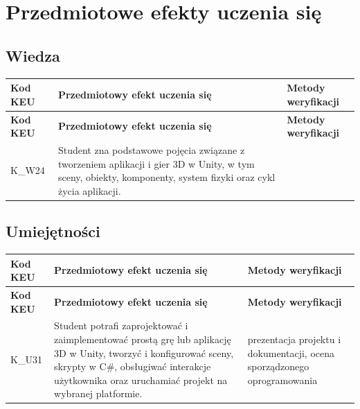 \documentclass[12pt, a4paper]{article}
\newcommand{\thdrule}{\noalign{\global\setlength{\extrarowheight}{0pt}}}
\newcommand{\thdend}{\noalign{\global\setlength{\extrarowheight}{3pt}}}
\begin{document}
\section{Przedmiotowe efekty uczenia się}

\subsection*{Wiedza}
{\scriptsize
\begin{longtable}{m{1.6cm}m{9.0cm}m{4.2cm}}
\thdrule\toprule
\rowcolor{pjatkRed} {\color{white}\footnotesize\textbf{\vphantom{Ag}Kod KEU}} & {\color{white}\footnotesize\textbf{\vphantom{Ag}Przedmiotowy efekt uczenia się}} & {\color{white}\footnotesize\textbf{\vphantom{Ag}Metody weryfikacji}} \\
\midrule\thdend
\endfirsthead
\thdrule\toprule
\rowcolor{pjatkRed} {\color{white}\footnotesize\textbf{\vphantom{Ag}Kod KEU}} & {\color{white}\footnotesize\textbf{\vphantom{Ag}Przedmiotowy efekt uczenia się}} & {\color{white}\footnotesize\textbf{\vphantom{Ag}Metody weryfikacji}} \\
\midrule\thdend
\endhead
  \rowcolor{tableRowLight} K\_W24 & Student zna podstawowe pojęcia związane z tworzeniem aplikacji i gier 3D w Unity, w tym sceny, obiekty, komponenty, system fizyki oraz cykl życia aplikacji. &  \\
\bottomrule
\end{longtable}}

\subsection*{Umiejętności}
{\scriptsize
\begin{longtable}{m{1.6cm}m{9.0cm}m{4.2cm}}
\thdrule\toprule
\rowcolor{pjatkRed} {\color{white}\footnotesize\textbf{\vphantom{Ag}Kod KEU}} & {\color{white}\footnotesize\textbf{\vphantom{Ag}Przedmiotowy efekt uczenia się}} & {\color{white}\footnotesize\textbf{\vphantom{Ag}Metody weryfikacji}} \\
\midrule\thdend
\endfirsthead
\thdrule\toprule
\rowcolor{pjatkRed} {\color{white}\footnotesize\textbf{\vphantom{Ag}Kod KEU}} & {\color{white}\footnotesize\textbf{\vphantom{Ag}Przedmiotowy efekt uczenia się}} & {\color{white}\footnotesize\textbf{\vphantom{Ag}Metody weryfikacji}} \\
\midrule\thdend
\endhead
  \rowcolor{tableRowLight} K\_U31 & Student potrafi zaprojektować i zaimplementować prostą grę lub aplikację 3D w Unity, tworzyć i konfigurować sceny, skrypty w C\#, obsługiwać interakcje użytkownika oraz uruchamiać projekt na wybranej platformie. & prezentacja projektu i dokumentacji, ocena sporządzonego oprogramowania \\
\bottomrule
\end{longtable}}
\end{document}

